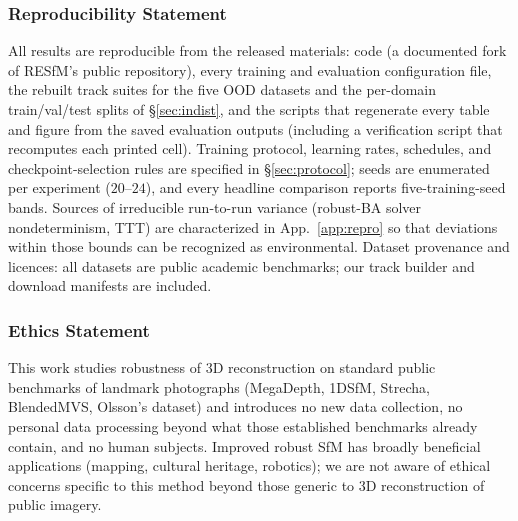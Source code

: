\documentclass{article}
\begin{document}
\subsubsection*{Reproducibility Statement}
All results are reproducible from the released materials: code (a documented fork of
RESfM's public repository), every training and evaluation configuration file, the
rebuilt track suites for the five OOD datasets and the per-domain train/val/test splits
of \S\ref{sec:indist}, and the scripts that regenerate every table and figure from the
saved evaluation outputs (including a verification script that recomputes each printed
cell). Training protocol, learning rates, schedules, and checkpoint-selection rules are
specified in \S\ref{sec:protocol}; seeds are enumerated per experiment ($20$--$24$),
and every headline comparison reports five-training-seed bands. Sources of
irreducible run-to-run variance (robust-BA solver nondeterminism, TTT) are
characterized in App.~\ref{app:repro} so that deviations within those bounds can be
recognized as environmental. Dataset provenance and licences: all datasets are public
academic benchmarks; our track builder and download manifests are included.

\subsubsection*{Ethics Statement}
This work studies robustness of 3D reconstruction on standard public benchmarks of
landmark photographs (MegaDepth, 1DSfM, Strecha, BlendedMVS, Olsson's dataset) and
introduces no new data collection, no personal data processing beyond what those
established benchmarks already contain, and no human subjects. Improved robust SfM has
broadly beneficial applications (mapping, cultural heritage, robotics); we are not
aware of ethical concerns specific to this method beyond those generic to 3D
reconstruction of public imagery.
\end{document}
